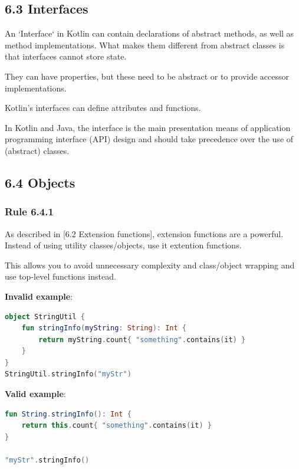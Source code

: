 {{{{\subsection*{\textbf{6.3 Interfaces}}

An `Interface` in Kotlin can contain declarations of abstract methods, as well as method implementations. What makes them different from abstract classes is that interfaces cannot store state.

They can have properties, but these need to be abstract or to provide accessor implementations.



Kotlin's interfaces can define attributes and functions.

In Kotlin and Java, the interface is the main presentation means of application programming interface (API) design and should take precedence over the use of (abstract) classes.



\subsection*{\textbf{6.4 Objects}}

\subsubsection*{\textbf{Rule 6.4.1}}
\leavevmode\newline

As described in [6.2 Extension functions], extension functions are a powerful. Instead of using utility classes/objects, use it extention functions.

This allows you to avoid unnecessary complexity and class/object wrapping and use top-level functions instead.



\textbf{Invalid example}:

\begin{lstlisting}[language=Kotlin]
object StringUtil {
    fun stringInfo(myString: String): Int {
        return myString.count{ "something".contains(it) }
    }
}
StringUtil.stringInfo("myStr")
\end{lstlisting}


\textbf{Valid example}:

\begin{lstlisting}[language=Kotlin]
fun String.stringInfo(): Int {
    return this.count{ "something".contains(it) }
}

"myStr".stringInfo()
\end{lstlisting}


}}}}
